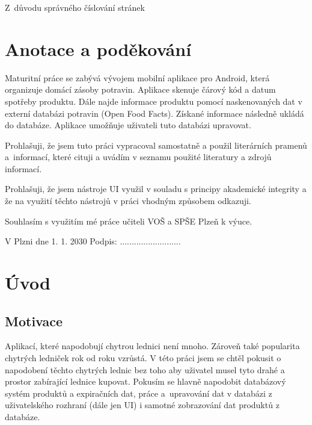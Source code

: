 \documentclass[12pt, a4paper, oneside]{report}
\begin{document}
{\sffamily\centering Z~důvodu správného číslování stránek}

\newpage
\chapter*{Anotace a poděkování} \indent
\thispagestyle{empty}
Maturitní práce se zabývá vývojem mobilní aplikace pro Android, která organizuje domácí zásoby potravin. Aplikace skenuje čárový kód a datum spotřeby produktu. Dále najde informace produktu pomocí naskenovaných dat v externí databázi potravin (Open Food Facts). Získané informace následně ukládá do databáze. Aplikace umožňuje uživateli tuto databázi  upravovat.

\vfill

Prohlašuji, že jsem tuto práci vypracoval samostatně a použil literárních pramenů a~\mbox{informací}, které cituji a uvádím v seznamu použité literatury a zdrojů informací.

Prohlašuji, že jsem nástroje UI využil v souladu s principy akademické integrity a že na využití těchto nástrojů v práci vhodným způsobem odkazuji.

Souhlasím s využitím mé práce učiteli VOŠ a SPŠE Plzeň k výuce.

\vspace{1cm}

V Plzni dne 1. 1. 2030 \hfill Podpis: ..........................

\newpage
\tableofcontents
\thispagestyle{empty}

\newpage

\chapter*{Úvod}
\section*{Motivace}
Aplikací, které napodobují chytrou lednici není mnoho. Zároveň také popularita chytrých ledniček rok od roku vzrůstá. V této práci jsem se chtěl pokusit o napodobení těchto chytrých lednic bez toho aby uživatel musel tyto drahé a prostor zabírající lednice kupovat. Pokusím se hlavně napodobit databázový systém produktů a expiračních dat, práce a~upravování dat v databázi z uživatelského rozhraní (dále jen UI) i samotné zobrazování dat produktů z databáze.
\end{document}
